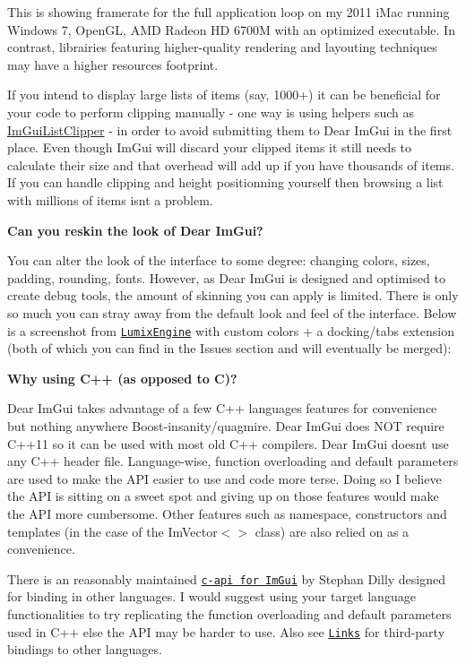 This is showing framerate for the full application loop on my 2011 i\+Mac running Windows 7, Open\+GL, A\+MD Radeon HD 6700M with an optimized executable. In contrast, librairies featuring higher-\/quality rendering and layouting techniques may have a higher resources footprint.

If you intend to display large lists of items (say, 1000+) it can be beneficial for your code to perform clipping manually -\/ one way is using helpers such as \hyperlink{struct_im_gui_list_clipper}{Im\+Gui\+List\+Clipper} -\/ in order to avoid submitting them to Dear Im\+Gui in the first place. Even though Im\+Gui will discard your clipped items it still needs to calculate their size and that overhead will add up if you have thousands of items. If you can handle clipping and height positionning yourself then browsing a list with millions of items isn\textquotesingle{}t a problem.

{\bfseries Can you reskin the look of Dear Im\+Gui?}

You can alter the look of the interface to some degree\+: changing colors, sizes, padding, rounding, fonts. However, as Dear Im\+Gui is designed and optimised to create debug tools, the amount of skinning you can apply is limited. There is only so much you can stray away from the default look and feel of the interface. Below is a screenshot from \href{https://github.com/nem0/LumixEngine}{\tt Lumix\+Engine} with custom colors + a docking/tabs extension (both of which you can find in the Issues section and will eventually be merged)\+:



{\bfseries Why using C++ (as opposed to C)?}

Dear Im\+Gui takes advantage of a few C++ languages features for convenience but nothing anywhere Boost-\/insanity/quagmire. Dear Im\+Gui does N\+OT require C++11 so it can be used with most old C++ compilers. Dear Im\+Gui doesn\textquotesingle{}t use any C++ header file. Language-\/wise, function overloading and default parameters are used to make the A\+PI easier to use and code more terse. Doing so I believe the A\+PI is sitting on a sweet spot and giving up on those features would make the A\+PI more cumbersome. Other features such as namespace, constructors and templates (in the case of the Im\+Vector$<$$>$ class) are also relied on as a convenience.

There is an reasonably maintained \href{https://github.com/Extrawurst/cimgui}{\tt c-\/api for Im\+Gui} by Stephan Dilly designed for binding in other languages. I would suggest using your target language functionalities to try replicating the function overloading and default parameters used in C++ else the A\+PI may be harder to use. Also see \href{https://github.com/ocornut/imgui/wiki/Links}{\tt Links} for third-\/party bindings to other languages.

